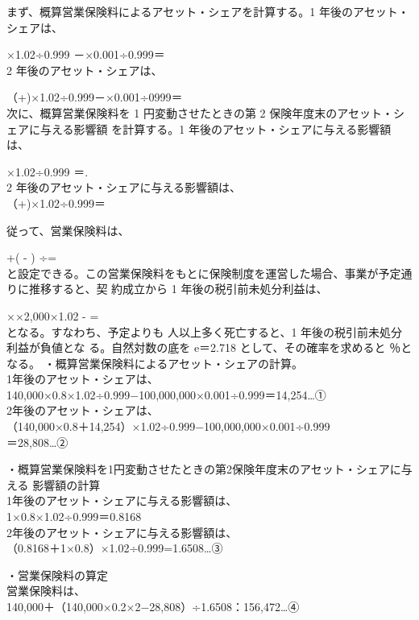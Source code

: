 \documentclass[report,gutter=10mm,fore-edge=10mm,uplatex,dvipdfmx]{jlreq}
\begin{document}
まず、概算営業保険料によるアセット・シェアを計算する。1 年後のアセット・シェアは、\par
\framebox[3zw]{　} ×1.02÷0.999 －\framebox[3zw]{　}×0.001÷0.999＝\\
2 年後のアセット・シェアは、\par
（\framebox[3zw]{　}+\framebox[3zw]{　})×1.02÷0.999－\framebox[3zw]{　}×0.001÷0999＝\\
次に、概算営業保険料を 1 円変動させたときの第 2 保険年度末のアセット・シェアに与える影響額
を計算する。1 年後のアセット・シェアに与える影響額は、\par
\framebox[3zw]{　}×1.02÷0.999 ＝\framebox[3zw]{　}.\\
2 年後のアセット・シェアに与える影響額は、\\
（\framebox[3zw]{　}+\framebox[3zw]{　})×1.02÷0.999＝\par
従って、営業保険料は、\par
\framebox[3zw]{　}+(\framebox[3zw]{　} - \framebox[3zw]{　}) ÷\framebox[3zw]{　}=\\
と設定できる。この営業保険料をもとに保険制度を運営した場合、事業が予定通りに推移すると、契
約成立から 1 年後の税引前未処分利益は、\par
\framebox[3zw]{　}×\framebox[3zw]{　}×2,000×1.02 -\framebox[3zw]{　} = \\
となる。すなわち、予定よりも
人以上多く死亡すると、1 年後の税引前未処分利益が負値とな
る。自然対数の底を e＝2.718 として、その確率を求めると
％となる。
\answer{}
・概算営業保険料によるアセット・シェアの計算。\\
1年後のアセット・シェアは、\\
140,000×0.8×1.02÷0.999−100,000,000×0.001÷0.999＝14,254…①\\
2年後のアセット・シェアは、\\
（140,000×0.8＋14,254）×1.02÷0.999−100,000,000×0.001÷0.999\\
＝28,808…②

・概算営業保険料を1円変動させたときの第2保険年度末のアセット・シェアに与える
影響額の計算\\
1年後のアセット・シェアに与える影響額は、\\
1×0.8×1.02÷0.999＝0.8168\\
2年後のアセット・シェアに与える影響額は、\\
（0.8168＋1×0.8）×1.02÷0.999=1.6508…③

・営業保険料の算定\\
営業保険料は、\\
140,000＋（140,000×0.2×2−28,808）÷1.6508：156,472…④
\end{document}
